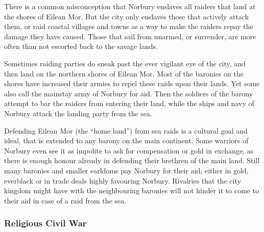 There is a common misconception that Norbury enslaves all raiders that land
at the shores of Eilean Mor. But the city only enslaves those that actively
attack them, or raid coastal villages and towns as a way to make the raiders
repay the damage they have caused. Those that sail from 
unarmed, or surrender, are more often than not escorted back to the savage
lands.

Sometimes raiding parties do sneak past the ever vigilant eye of the city,
and then land on the northern shores of Eilean Mor. Most of the baronies
on the shores have increased their armies to repel these raids upon their
lands. Yet some also call the mainstay army of Norbury for aid. Then the
soldiers of the barony attempt to bar the raiders from entering their land,
while the ships and navy of Norbury attack the landing party from the sea.

Defending Eilean Mor (the ``home land'') from sea raids is a cultural goal and
ideal, that is extended to any barony on the main continent. Some warriors of
Norbury even see it as impolite to ask for compensation or gold in exchange,
as there is enough honour already in defending their brethren of the main
land. Still many baronies and smaller earldoms pay Norbury for their aid,
either in gold, everblack or in trade deals highly favouring Norbury. Rivalries
that the city kingdom might have with the neighbouring baronies will not
hinder it to come to their aid in case of a raid from the sea.

\subsubsection{Religious Civil War}
\label{sec:Religious Civil War}

